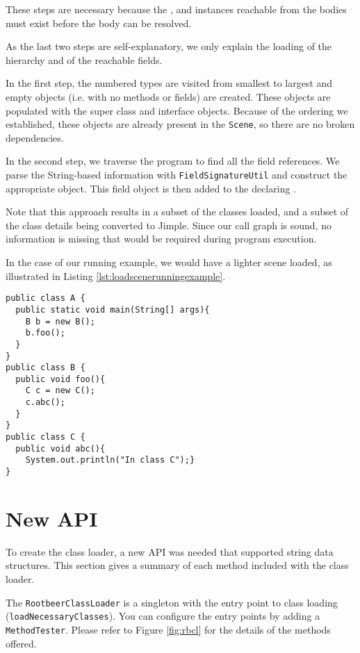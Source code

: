\documentclass[preprint]{sigplanconf}
\begin{document}
These steps are necessary because the \sootclass, \sootfield and \sootmethod instances reachable from the bodies must exist before the body can be resolved.

As the last two steps are self-explanatory, we only explain the loading of the hierarchy and of the reachable fields.

In the first step, the numbered types are visited from smallest to largest and empty \sootclass objects (i.e. with no methods or fields) are created. These objects are populated with the super class and interface \sootclass objects. Because of the ordering we established, these objects are already present in the {\tt Scene}, so there are no broken dependencies.

In the second step, we traverse the program to find all the field references. We parse the String-based information with {\tt FieldSignatureUtil} and construct the appropriate \sootfield object. This field object is then added to the declaring \sootclass.


Note that this approach results in a subset of the classes loaded, and a subset of the class details being converted to Jimple. Since our call graph is sound, no information is missing that would be required during program execution.

In the case of our running example, we would have a lighter scene loaded, as illustrated in Listing \ref{lst:loadscenerunningexample}.

\begin{lstlisting}[caption={Loaded Scene for Running example},label={lst:loadscenerunningexample},float=!ht]
public class A {
  public static void main(String[] args){
    B b = new B();
    b.foo();
  }
}
public class B {
  public void foo(){
    C c = new C();
    c.abc();
  }
}
public class C {
  public void abc(){
    System.out.println("In class C");}
}
\end{lstlisting}

\section{New API}
\label{sec:api}
To create the \rb class loader, a new API was needed that supported string data structures. This section gives a summary of each method included with the \rb class loader.

The {\tt RootbeerClassLoader} is a singleton with the entry point to class loading ({\tt loadNecessaryClasses}). You can configure the entry points by adding a {\tt MethodTester}. Please refer to Figure \ref{fig:rbcl} for the details of the methods offered.
\end{document}
